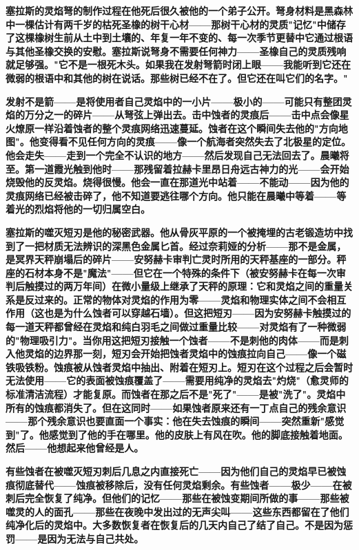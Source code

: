 \documentclass[12pt,a4paper,openany]{ctexbook}
\begin{document}
\textbf{塞拉斯的灵焰弩的制作过程在他死后很久被他的一个弟子公开。弩身材料是黑森林中一棵估计有两千岁的枯死圣橡的树干心材——那树干心材的灵质"记忆"中储存了这棵橡树生前从土中到土壤的、年复一年不变的、每一次季节更替中它通过根语与其他圣橡交换的安慰。塞拉斯说弩身不需要任何神力——圣橡自己的灵质残响就足够强。"它不是一根死木头。如果我在发射弩箭时闭上眼——我能听到它还在微弱的根语中和其他的树在说话。那些树已经不在了。但它还在叫它们的名字。"}


\textbf{发射不是箭——是将使用者自己灵焰中的一小片——极小的——可能只有整团灵焰的万分之一的碎片——从弩弦上弹出去。击中蚀者的灵痕后——击中点会像星火燎原一样沿着蚀者的整个灵痕网络迅速蔓延。蚀者在这个瞬间失去他的"方向地图"。他变得看不见任何方向的灵痕——像一个航海者突然失去了北极星的定位。他会走失——走到一个完全不认识的地方——然后发现自己无法回去了。晨曦将至。第一道霞光触到他时——那残留着拉赫卡里昂日舟远古神力的光——会开始烧毁他的反灵焰。烧得很慢。他会一直在那道光中站着——不能动——因为他的灵痕网络已经被击碎了，他不知道要逃往哪个方向。他只能在晨曦中等着——等着光的烈焰将他的一切归属空白。}


\textbf{塞拉斯的噬灭短刃是他的秘密武器。他从骨灰平原的一个被掩埋的古老锻造坊中找到了一把材质无法辨识的深黑色金属匕首。经过奈莉娅的分析——那不是金属，是冥界天秤崩塌后的碎片——安努赫卡审判亡灵时所用的天秤基座的一部分。秤座的石材本身不是"魔法"——但它在一个特殊的条件下（被安努赫卡在每一次审判后触摸过的两万年间）在微小量级上继承了天秤的原理：它和灵焰之间的重量关系是反过来的。正常的物体对灵焰的作用为零——灵焰和物理实体之间不会相互作用（这也是为什么蚀者可以穿越石墙）。但这把短刃——因为安努赫卡触摸过的每一道天秤都曾经在灵焰和纯白羽毛之间做过重量比较——对灵焰有了一种微弱的"物理吸引力"。当你用这把短刃接触一个蚀者——不是刺他的肉体——而是刺入他灵焰的边界那一刻，短刃会开始把蚀者灵焰中的蚀痕拉向自己——像一个磁铁吸铁粉。蚀痕被从蚀者灵焰中抽出、附着在短刃上。短刃在这个过程之后会暂时无法使用——它的表面被蚀痕覆盖了——需要用纯净的灵焰去"灼烧"（愈灵师的标准清洁流程）才能复原。而蚀者在那之后不是"死了"——是被"洗了"。灵焰中所有的蚀痕都消失了。但在这同时——如果蚀者原来还有一丁点自己的残余意识——那个残余意识也要直面一个事实：他在失去蚀痕的瞬间——突然重新"感觉到"了。他感觉到了他的手在哪里。他的皮肤上有风在吹。他的脚底接触着地面。然后——他想起来他曾经是人。}


\textbf{有些蚀者在被噬灭短刃刺后几息之内直接死亡——因为他们自己的灵焰早已被蚀痕彻底替代——蚀痕被移除后，没有任何灵焰剩余。有些蚀者——极少——在被刺后完全恢复了纯净。但他们的记忆——那些在被蚀变期间所做的事——那些被噬灵的人的面孔——那些在夜晚中发出过的无声尖叫——这些东西都留在了他们纯净化后的灵焰中。大多数恢复者在恢复后的几天内自己了结了自己。不是因为惩罚——是因为无法与自己共处。}
\end{document}
